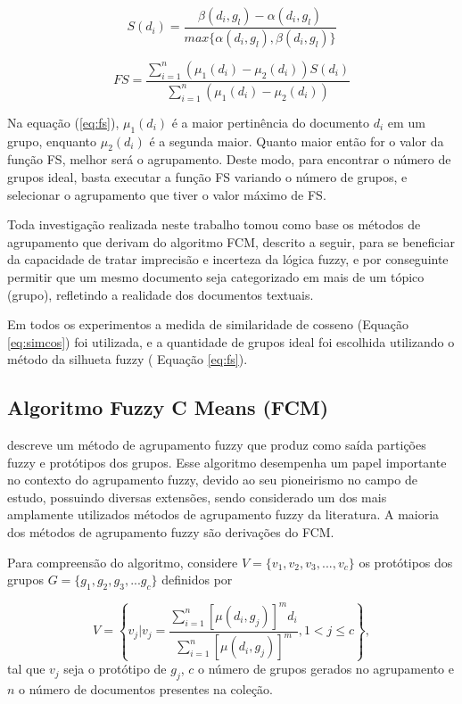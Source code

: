 \begin{equation} 
S(d_i) = \frac{\beta(d_i, g_l) - \alpha(d_i,g_l)}{max\{\alpha(d_i,g_l), \beta(d_i,g_l)\}} \label{eq:silhuette}
\end{equation}


\begin{equation} 
FS = \frac{\sum_{i=1}^n{(\mu_1(d_i) - \mu_2(d_i))}S(d_i)}{\sum_{i=1}^n{(\mu_1(d_i) - \mu_2(d_i))}}
\label{eq:fs}
\end{equation} 

Na equação (\ref{eq:fs}), $\mu_1(d_i)$ é a maior
  pertinência do documento $d_i$ em um grupo, enquanto $\mu_2(d_i)$ é a segunda maior. Quanto maior
  então for o valor da função FS, melhor será o agrupamento. Deste modo, para encontrar o número de
  grupos ideal, basta executar a função FS variando o número de grupos, e selecionar o agrupamento
  que tiver o valor máximo de FS.

Toda investigação realizada neste trabalho tomou como base os métodos de agrupamento que derivam do
algoritmo FCM\cite{Bezdek1984}, descrito a seguir, para se beneficiar da capacidade de tratar imprecisão e incerteza da
lógica fuzzy, e por conseguinte permitir que um mesmo documento seja categorizado em mais de um
tópico (grupo), refletindo a realidade dos documentos textuais. 

Em todos os experimentos a medida de similaridade de cosseno (Equação \ref{eq:simcos}) foi utilizada, e a quantidade de grupos ideal foi escolhida utilizando o método da silhueta fuzzy ( Equação \ref{eq:fs}).

\subsection{Algoritmo Fuzzy C Means (FCM)} 

 descreve um método de agrupamento fuzzy
que produz como saída partições fuzzy e protótipos dos grupos. Esse algoritmo desempenha um papel
importante no contexto do agrupamento fuzzy, devido ao seu pioneirismo no campo de estudo, possuindo
diversas extensões, sendo considerado um dos mais amplamente utilizados métodos de
agrupamento fuzzy da literatura\cite{Pal2005}. A maioria dos métodos de agrupamento fuzzy são
derivações do FCM\cite{Krishnapuram1993}.

Para compreensão do algoritmo, considere $V = \{v_1,v_2,v_3,...,v_c\}$ os protótipos dos grupos $G = \{g_1,g_2,g_3,...g_c\}$
definidos por 

\begin{equation} 
  V = \left\{ v_j | v_j = \frac{\sum_{i=1}^n[\mu(d_i,g_j)]^m d_i}{\sum_{i=1}^n[\mu(d_i,g_j)]^m}, 
  1 < j \leq c \right\}, 
  \label{eq:prototipos} 
\end{equation}
tal que $v_j$ seja o protótipo de $g_j$, $c$ o número de grupos gerados no agrupamento e $n$ o número de
documentos presentes na coleção. 

